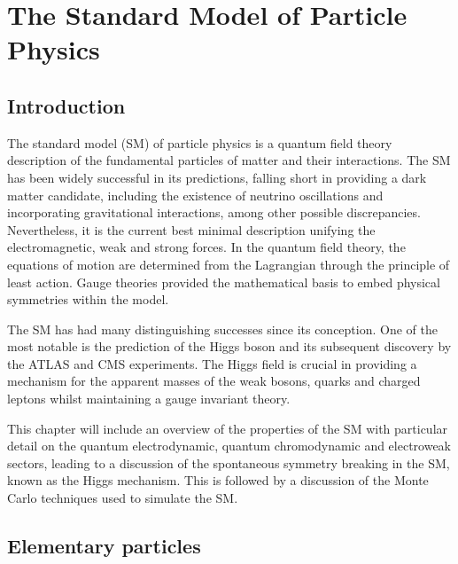 \chapter{The Standard Model of Particle Physics}
\label{chap:theory}


\section{Introduction}

The standard model (SM) of particle physics is a quantum field theory
description of the fundamental particles of matter and their interactions. The
SM has been widely successful in its predictions, falling short in providing a
dark matter candidate, including the existence of neutrino oscillations and
incorporating gravitational interactions, among other possible discrepancies.
Nevertheless, it is the current best minimal description unifying the
electromagnetic, weak and strong forces. In the quantum field theory, the
equations of motion are determined from the Lagrangian through the principle
of least action. Gauge theories provided the mathematical basis to embed
physical symmetries within the model. 

The SM has had many distinguishing successes since its conception. One of
the most notable is the prediction of the Higgs boson
\cite{PhysRevLett.13.321,PhysRevLett.13.508,PhysRevLett.13.585} and its
subsequent discovery by the ATLAS \cite{Aad:2012tfa} and CMS
\cite{Chatrchyan:2012xdj} experiments. The Higgs field is crucial in providing
a mechanism for the apparent masses of the weak bosons, quarks and charged
leptons whilst maintaining a gauge invariant theory.

This chapter will include an overview of the properties of the SM with
particular detail on the quantum electrodynamic, quantum chromodynamic and
electroweak sectors, leading to a discussion of the spontaneous symmetry breaking in the SM, known as the Higgs mechanism. This is followed
by a discussion of the Monte Carlo techniques used to simulate the SM.


\section{Elementary particles}

